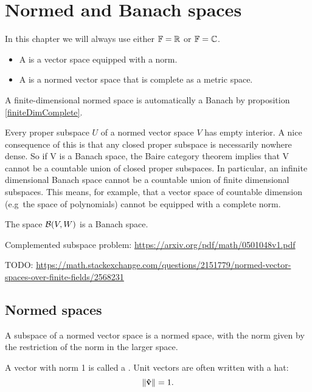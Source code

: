 \chapter{Normed and Banach spaces}
In this chapter we will always use either $\mathbb{F} = \mathbb{R}$ or $\mathbb{F} = \mathbb{C}$.

\begin{definition}
\begin{itemize}
\item A  is a vector space equipped with a norm.
\item A  is a normed vector space that is complete as a metric space.
\end{itemize}
\end{definition}

A finite-dimensional normed space is automatically a Banach by proposition \ref{finiteDimComplete}.

Every proper subspace $U$ of a normed vector space $V$ has empty interior.
A nice consequence of this is that any closed proper subspace is necessarily nowhere dense. So if V is a Banach space, the Baire category theorem implies that V cannot be a countable union of closed proper subspaces. In particular, an infinite dimensional Banach space cannot be a countable union of finite dimensional subspaces. This means, for example, that a vector space of countable dimension (e.g\ the space of polynomials) cannot be equipped with a complete norm.

The space $\operatorname{\mathcal{B}}(V,W)$ is a Banach space.


Complemented subspace problem: \url{https://arxiv.org/pdf/math/0501048v1.pdf}


TODO: \url{https://math.stackexchange.com/questions/2151779/normed-vector-spaces-over-finite-fields/2568231}

\section{Normed spaces}

\begin{lemma}
A subspace of a normed vector space is a normed space, with the norm given by the restriction of the norm in the larger space.
\end{lemma}

\begin{definition}
A vector with norm 1 is called a . Unit vectors are often written with a hat:
\[ \lVert\boldsymbol{\mathrm{\hat{v}}}\rVert = 1. \]
\end{definition}

